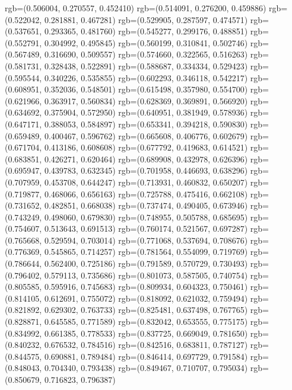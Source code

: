 {{{					rgb=(0.506004, 0.270557, 0.452410)
					rgb=(0.514091, 0.276200, 0.459886)
					rgb=(0.522042, 0.281881, 0.467281)
					rgb=(0.529905, 0.287597, 0.474571)
					rgb=(0.537651, 0.293365, 0.481760)
					rgb=(0.545277, 0.299176, 0.488851)
					rgb=(0.552791, 0.304992, 0.495845)
					rgb=(0.560199, 0.310841, 0.502746)
					rgb=(0.567489, 0.316690, 0.509557)
					rgb=(0.574660, 0.322565, 0.516263)
					rgb=(0.581731, 0.328438, 0.522891)
					rgb=(0.588687, 0.334334, 0.529423)
					rgb=(0.595544, 0.340226, 0.535855)
					rgb=(0.602293, 0.346118, 0.542217)
					rgb=(0.608951, 0.352036, 0.548501)
					rgb=(0.615498, 0.357980, 0.554700)
					rgb=(0.621966, 0.363917, 0.560834)
					rgb=(0.628369, 0.369891, 0.566920)
					rgb=(0.634692, 0.375904, 0.572950)
					rgb=(0.640951, 0.381949, 0.578936)
					rgb=(0.647171, 0.388053, 0.584897)
					rgb=(0.653341, 0.394218, 0.590830)
					rgb=(0.659489, 0.400467, 0.596762)
					rgb=(0.665608, 0.406776, 0.602679)
					rgb=(0.671704, 0.413186, 0.608608)
					rgb=(0.677792, 0.419683, 0.614521)
					rgb=(0.683851, 0.426271, 0.620464)
					rgb=(0.689908, 0.432978, 0.626396)
					rgb=(0.695947, 0.439783, 0.632345)
					rgb=(0.701958, 0.446693, 0.638296)
					rgb=(0.707959, 0.453708, 0.644247)
					rgb=(0.713931, 0.460832, 0.650207)
					rgb=(0.719877, 0.468066, 0.656163)
					rgb=(0.725788, 0.475416, 0.662108)
					rgb=(0.731652, 0.482851, 0.668038)
					rgb=(0.737474, 0.490405, 0.673946)
					rgb=(0.743249, 0.498060, 0.679830)
					rgb=(0.748955, 0.505788, 0.685695)
					rgb=(0.754607, 0.513643, 0.691513)
					rgb=(0.760174, 0.521567, 0.697287)
					rgb=(0.765668, 0.529594, 0.703014)
					rgb=(0.771068, 0.537694, 0.708676)
					rgb=(0.776369, 0.545865, 0.714257)
					rgb=(0.781564, 0.554099, 0.719769)
					rgb=(0.786644, 0.562400, 0.725186)
					rgb=(0.791589, 0.570729, 0.730493)
					rgb=(0.796402, 0.579113, 0.735686)
					rgb=(0.801073, 0.587505, 0.740754)
					rgb=(0.805585, 0.595916, 0.745683)
					rgb=(0.809934, 0.604323, 0.750461)
					rgb=(0.814105, 0.612691, 0.755072)
					rgb=(0.818092, 0.621032, 0.759494)
					rgb=(0.821892, 0.629302, 0.763733)
					rgb=(0.825481, 0.637498, 0.767765)
					rgb=(0.828871, 0.645585, 0.771589)
					rgb=(0.832042, 0.653555, 0.775175)
					rgb=(0.834992, 0.661385, 0.778533)
					rgb=(0.837725, 0.669049, 0.781650)
					rgb=(0.840232, 0.676532, 0.784516)
					rgb=(0.842516, 0.683811, 0.787127)
					rgb=(0.844575, 0.690881, 0.789484)
					rgb=(0.846414, 0.697729, 0.791584)
					rgb=(0.848043, 0.704340, 0.793438)
					rgb=(0.849467, 0.710707, 0.795034)
					rgb=(0.850679, 0.716823, 0.796387)
}}}
